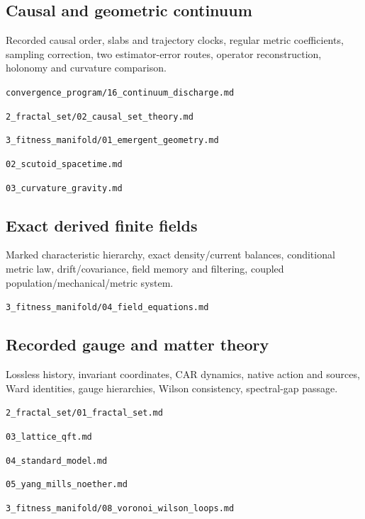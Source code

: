 \documentclass[11pt,a4paper]{article}
\begin{document}
\par\medskip\noindent\begin{minipage}{\linewidth}
\subsection*{Causal and geometric continuum}
Recorded causal order, slabs and trajectory clocks, regular metric coefficients, sampling correction, two estimator-error routes, operator reconstruction, holonomy and curvature comparison.

{\small\nolinkurl{convergence_program/16_continuum_discharge.md}\par}
{\small\nolinkurl{2_fractal_set/02_causal_set_theory.md}\par}
{\small\nolinkurl{3_fitness_manifold/01_emergent_geometry.md}\par}
{\small\nolinkurl{02_scutoid_spacetime.md}\par}
{\small\nolinkurl{03_curvature_gravity.md}\par}
\end{minipage}\par
\par\medskip\noindent\begin{minipage}{\linewidth}
\subsection*{Exact derived finite fields}
Marked characteristic hierarchy, exact density/current balances, conditional metric law, drift/covariance, field memory and filtering, coupled population/mechanical/metric system.

{\small\nolinkurl{3_fitness_manifold/04_field_equations.md}\par}
\end{minipage}\par
\par\medskip\noindent\begin{minipage}{\linewidth}
\subsection*{Recorded gauge and matter theory}
Lossless history, invariant coordinates, CAR dynamics, native action and sources, Ward identities, gauge hierarchies, Wilson consistency, spectral-gap passage.

{\small\nolinkurl{2_fractal_set/01_fractal_set.md}\par}
{\small\nolinkurl{03_lattice_qft.md}\par}
{\small\nolinkurl{04_standard_model.md}\par}
{\small\nolinkurl{05_yang_mills_noether.md}\par}
{\small\nolinkurl{3_fitness_manifold/08_voronoi_wilson_loops.md}\par}
\end{minipage}\par
\end{document}

